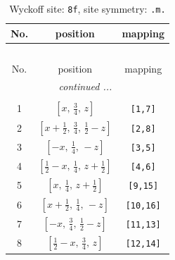 \documentclass[fleqn,8pt]{jsarticle}
\begin{document}
\begin{longtable}{ccc}
\caption{Wyckoff site: {\tt 8f}, site symmetry: {\tt .m.}}
 \\
 \hline \hline
No. & position & mapping \\ \hline \endfirsthead

\multicolumn{2}{l}{\tablename\ \thetable{}} \\
 \hline \hline
No. & position & mapping \\ \hline \endhead

 \hline \hline
\multicolumn{2}{r}{\footnotesize\it continued ...} \\ \endfoot

 \hline \hline
\multicolumn{2}{r}{} \\ \endlastfoot

1 & $\left[ x,\, \frac{3}{4},\, z \right]$ & {\tt [1,7]} \\ \hline
2 & $\left[ x + \frac{1}{2},\, \frac{3}{4},\, \frac{1}{2} - z \right]$ & {\tt [2,8]} \\ \hline
3 & $\left[ - x,\, \frac{1}{4},\, - z \right]$ & {\tt [3,5]} \\ \hline
4 & $\left[ \frac{1}{2} - x,\, \frac{1}{4},\, z + \frac{1}{2} \right]$ & {\tt [4,6]} \\ \hline
5 & $\left[ x,\, \frac{1}{4},\, z + \frac{1}{2} \right]$ & {\tt [9,15]} \\ \hline
6 & $\left[ x + \frac{1}{2},\, \frac{1}{4},\, - z \right]$ & {\tt [10,16]} \\ \hline
7 & $\left[ - x,\, \frac{3}{4},\, \frac{1}{2} - z \right]$ & {\tt [11,13]} \\ \hline
8 & $\left[ \frac{1}{2} - x,\, \frac{3}{4},\, z \right]$ & {\tt [12,14]} \\
\end{longtable}
\renewcommand{\arraystretch}{1.2}
\end{document}
